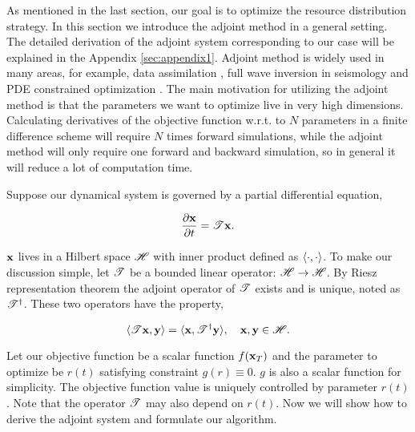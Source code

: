 
As mentioned in the last section, our goal is to optimize the resource distribution strategy. In this section we introduce the adjoint method in a general setting. The detailed derivation of the adjoint system corresponding to our case will be explained in the Appendix \ref{sec:appendix1}. Adjoint method is widely used in many areas, for example, data assimilation \cite{li2011variational}, full wave inversion in seismology \cite{tromp2008spectral} and PDE constrained optimization \cite{chen2015optimal}. The main motivation for utilizing the adjoint method is that the parameters we want to optimize live in very high dimensions. Calculating derivatives of the objective function w.r.t. to $N$ parameters in a finite difference scheme will require $N$ times forward simulations, while the adjoint method will only require one forward and backward simulation, so in general it will reduce a lot of computation time.

Suppose our dynamical system is governed by a partial differential equation, 

\begin{equation}
	\label{eq:forward}
	\frac {\partial{\bf x}} {\partial t} = {\mathscr T} {\bf x} .
\end{equation}

${\bf x}$ lives in a Hilbert space $\mathscr H$ with inner product defined as $\langle \cdot, \cdot\rangle$. To make our discussion simple, let ${\mathscr T}$ be a bounded linear operator: ${\mathscr H} \rightarrow {\mathscr H}$. By Riesz representation theorem the adjoint operator of ${\mathscr T}$ exists and is unique, noted as ${\mathscr T^{\dagger}}$. These two operators have the property, 

\begin{equation}
	\label{eq:adj_property}
	\langle {\mathscr T}{\bf x}, {\bf y}\rangle = 	\langle {\bf x}, {\mathscr T^{\dagger}}{\bf y}\rangle, \quad {\bf x}, {\bf y} \in {\mathscr H}.
\end{equation}

Let our objective function be a scalar function $f({\bf x}_T)$ and the parameter to optimize be $r(t)$ satisfying constraint $g(r)  \equiv 0$. $g$ is also a scalar function for simplicity. The objective function value is uniquely controlled by parameter $r(t)$. Note that the operator ${\mathscr T}$ may also depend on $r(t)$. Now we will show how to derive the adjoint system and formulate our algorithm.

